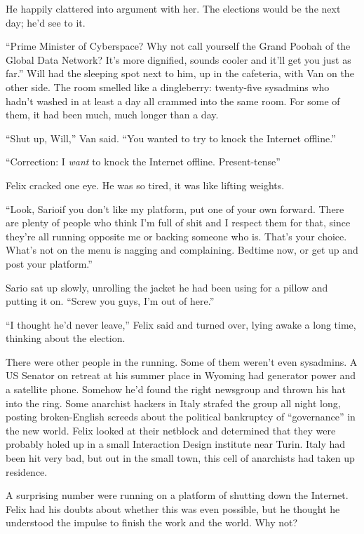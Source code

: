 He happily clattered into argument with her. The elections would be
the next day; he’d see to it.

\tb

“Prime Minister of Cyberspace? Why not call yourself the Grand
Poobah of the Global Data Network? It’s more dignified, sounds
cooler and it’ll get you just as far.” Will had the sleeping spot
next to him, up in the cafeteria, with Van on the other side. The
room smelled like a dingleberry: twenty-five sysadmins who hadn’t
washed in at least a day all crammed into the same room. For some
of them, it had been much, much longer than a day.

“Shut up, Will,” Van said. “You wanted to try to knock the Internet
offline.”

“Correction: I \emph{want} to knock the Internet offline.
Present-tense”

Felix cracked one eye. He was so tired, it was like lifting
weights.

“Look, Sario\dash{}if you don’t like my platform, put one of your own
forward. There are plenty of people who think I’m full of shit and
I respect them for that, since they’re all running opposite me or
backing someone who is. That’s your choice. What’s not on the menu
is nagging and complaining. Bedtime now, or get up and post your
platform.”

Sario sat up slowly, unrolling the jacket he had been using for a
pillow and putting it on. “Screw you guys, I’m out of here.”

“I thought he’d never leave,” Felix said and turned over, lying
awake a long time, thinking about the election.

There were other people in the running. Some of them weren’t even
sysadmins. A US Senator on retreat at his summer place in Wyoming
had generator power and a satellite phone. Somehow he’d found the
right newsgroup and thrown his hat into the ring. Some anarchist
hackers in Italy strafed the group all night long, posting
broken-English screeds about the political bankruptcy of
“governance” in the new world. Felix looked at their netblock and
determined that they were probably holed up in a small Interaction
Design institute near Turin. Italy had been hit very bad, but out
in the small town, this cell of anarchists had taken up residence.

A surprising number were running on a platform of shutting down the
Internet. Felix had his doubts about whether this was even
possible, but he thought he understood the impulse to finish the
work and the world. Why not?


